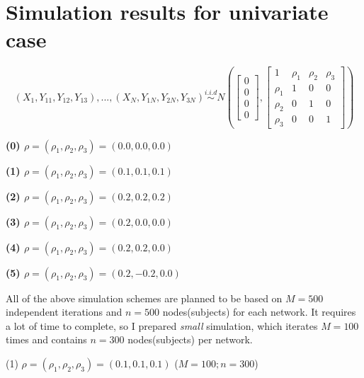 \documentclass[12pt]{report}
\begin{document}
 





\newpage
\section{Simulation results for univariate case}

\begin{equation} 
\label{eq:latent}
(X_1, Y_{11}, Y_{12}, Y_{13}), ... , (X_N, Y_{1N}, Y_{2N}, Y_{3N})  \overset{i.i.d}{\sim} N \left( \begin{bmatrix} 0 \\ 0 \\ 0 \\ 0 \end{bmatrix}, \begin{bmatrix}1 & \rho_{1} & \rho_{2}&  \rho_{3} \\ \rho_{1} & 1 & 0 & 0 \\ \rho_{2} & 0 & 1 & 0 \\ \rho_{3} & 0 & 0 & 1  \end{bmatrix}  \right)
\end{equation}

\textbf{(0) $\rho = (\rho_{1}, \rho_{2}, \rho_{3}) = (0.0, 0.0, 0.0)$}

\textbf{(1) $\rho = (\rho_{1}, \rho_{2}, \rho_{3}) = (0.1, 0.1, 0.1)$}


\textbf{(2) $\rho = (\rho_{1}, \rho_{2}, \rho_{3}) = (0.2, 0.2, 0.2)$}

\textbf{(3) $\rho = (\rho_{1}, \rho_{2}, \rho_{3}) = (0.2, 0.0, 0.0)$}

\textbf{(4) $\rho = (\rho_{1}, \rho_{2}, \rho_{3}) = (0.2, 0.2, 0.0)$}

\textbf{(5) $\rho = (\rho_{1}, \rho_{2}, \rho_{3}) = (0.2, -0.2, 0.0)$}


 All of the above simulation schemes are planned to be based on $M =500$ independent iterations and $n=500$ nodes(subjects) for each network. It requires a lot of time to complete, so I prepared \textit{small} simulation, which iterates $M=100$ times and contains $n = 300$ nodes(subjects) per network.  
 
 (1) $\rho = (\rho_{1}, \rho_{2}, \rho_{3}) = (0.1, 0.1, 0.1)$ ($M = 100; n = 300$)
\end{document}
